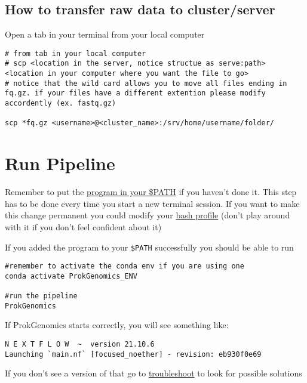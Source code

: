 \documentclass[
]{book}
\begin{document}
\hypertarget{how-to-transfer-raw-data-to-clusterserver}{%
\section{How to transfer raw data to cluster/server}\label{how-to-transfer-raw-data-to-clusterserver}}

Open a tab in your terminal from your local computer

\begin{verbatim}
# from tab in your local computer
# scp <location in the server, notice structue as serve:path> <location in your computer where you want the file to go>
# notice that the wild card allows you to move all files ending in fq.gz. if your files have a different extention please modify accordently (ex. fastq.gz)

scp *fq.gz <username>@<cluster_name>:/srv/home/username/folder/
\end{verbatim}

\hypertarget{run-pipeline}{%
\chapter{Run Pipeline}\label{run-pipeline}}

Remember to put the \href{getting-started.html}{program in your \$PATH} if you haven't done it. This step has to be done every time you start a new terminal session. If you want to make this change permanent you could modify your \href{https://stackoverflow.com/questions/14637979/how-to-permanently-set-path-on-linux-unix}{bash profile} (don't play around with it if you don't feel confident about it)

If you added the program to your \texttt{\$PATH} successfully you should be able to run

\begin{verbatim}
#remember to activate the conda env if you are using one
conda activate ProkGenomics_ENV

#run the pipeline
ProkGenomics
\end{verbatim}

If ProkGenomics starts correctly, you will see something like:

\begin{verbatim}
N E X T F L O W  ~  version 21.10.6
Launching `main.nf` [focused_noether] - revision: eb930f0e69
\end{verbatim}

If you don't see a version of that go to \href{troubleshooting.html}{troubleshoot} to look for possible solutions
\end{document}
